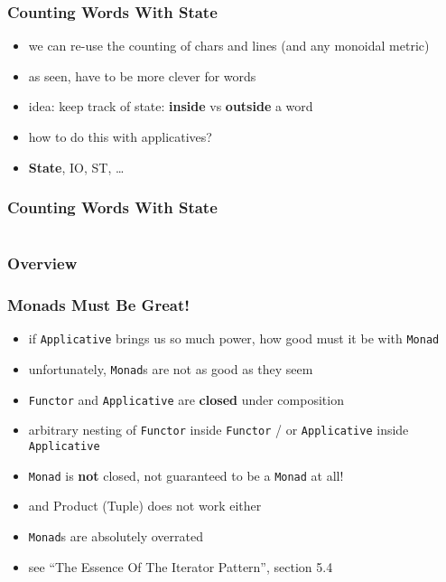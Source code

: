 \documentclass[aspectratio=169]{beamer}
\begin{document}
\begin{frame}
  \frametitle{Counting Words \textemdash{} With State}
  \begin{itemize}
  \item we can re-use the counting of chars and lines (and any monoidal metric)
  \item as seen, have to be more clever for words
  \item idea: keep track of state: \textbf{inside} vs \textbf{outside} a word
  \item how to do this with applicatives?
  \item \textbf{State}, IO, ST, \ldots{}
  \end{itemize}
\end{frame}

\begin{frame}[fragile]
  \frametitle{Counting Words \textemdash{} With State}
  \inputminted[fontsize=\small]{scala}{snippets/count-words-state.scala}
\end{frame}

\begin{frame}
  \frametitle{Overview}
  \def\firstcircle{(0,0) ellipse (20mm and 5mm)}
  \def\secondcircle{(0,0) ellipse (25mm and 12mm)}
  \def\thirdcircle{(0,0) ellipse (35mm and 20mm)}
  \begin{center}
  \end{center}
\end{frame}

\begin{frame}
  \frametitle{Monads Must Be Great!}
  \begin{itemize}
  \item if \texttt{Applicative} brings us so much power, how good must it be with \texttt{Monad}
  \item unfortunately, \texttt{Monad}s are not as good as they seem
  \item \texttt{Functor} and \texttt{Applicative} are \textbf{closed} under composition
  \item arbitrary nesting of \texttt{Functor} inside \texttt{Functor}
    / or \texttt{Applicative} inside \texttt{Applicative}
  \item \texttt{Monad} is \textbf{not} closed, not guaranteed to be a \texttt{Monad} at all!
  \item and Product (Tuple) does not work either
  \item \texttt{Monad}s are absolutely overrated
  \item see ``The Essence Of The Iterator Pattern'', section 5.4
  \end{itemize}
\end{frame}
\end{document}
